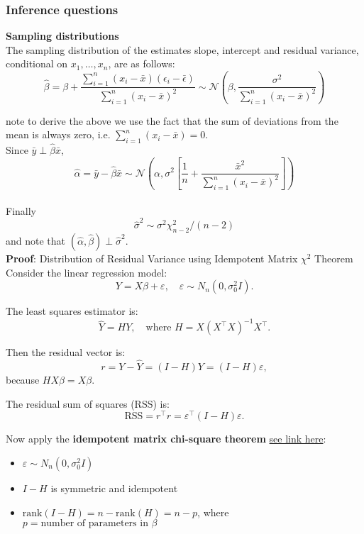 \documentclass{article}
\begin{document}
\subsubsection{Inference questions}
\textbf{Sampling distributions}\\
The sampling distribution of the estimates slope, intercept and residual variance, conditional on $x_1, \ldots, x_n$, are as follows:
$$ \hat{\beta} = \beta + \frac{\sum_{i=1}^{n}(x_i - \bar{x})(\epsilon_i - \bar{\epsilon})}{\sum_{i=1}^{n}(x_i - \bar{x})^2} \sim \mathcal{N}\left(\beta, \frac{\sigma^2}{\sum_{i=1}^{n}(x_i - \bar{x})^2}\right)$$

note to derive the above we use the fact that the sum of deviations from the mean is always zero, i.e. $\sum_{i=1}^{n} (x_i - \bar{x}) = 0$. \\

Since $\bar{y} \perp \hat{\beta}\bar{x}$,
$$ \hat{\alpha} = \bar{y} - \hat{\beta}\bar{x} \sim \mathcal{N}\left(\alpha, \sigma^2\left[ \frac{1}{n} + \frac{\bar{x}^2}{\sum_{i=1}^{n}(x_i - \bar{x})^2}\right]\right) $$
\\

Finally
$$ \hat{\sigma}^2 \sim \sigma^2 \chi^2_{n-2}/(n-2) $$
and note that $(\hat{\alpha}, \hat{\beta}) \perp \hat{\sigma}^2$. \\

\textbf{Proof}: Distribution of Residual Variance using Idempotent Matrix $\chi^2$ Theorem \\
Consider the linear regression model:
\[
  Y = X\beta + \varepsilon, \quad \varepsilon \sim N_n(0, \sigma_0^2 I).
\]

The least squares estimator is:
\[
  \hat{Y} = HY, \quad \text{where } H = X(X^\top X)^{-1}X^\top.
\]

Then the residual vector is:
\[
  r = Y - \hat{Y} = (I - H)Y = (I - H)\varepsilon,
\]
because \( HX\beta = X\beta \).

The residual sum of squares (RSS) is:
\[
  \text{RSS} = r^\top r = \varepsilon^\top (I - H)\varepsilon.
\]

Now apply the \textbf{idempotent matrix chi-square theorem} \href{https://www.statlect.com/probability-distributions/normal-distribution-quadratic-forms}{see link here}:

\begin{itemize}
  \item \( \varepsilon \sim N_n(0, \sigma_0^2 I) \)
  \item \( I - H \) is symmetric and idempotent
  \item \( \text{rank}(I - H) = n - \text{rank}(H) = n - p \), where \( p = \text{number of parameters in } \beta \)
\end{itemize}
\end{document}
